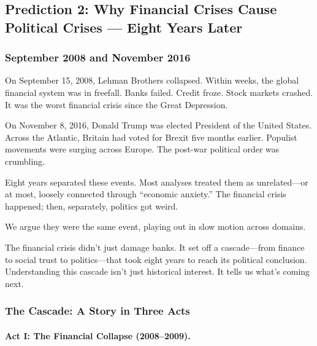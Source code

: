 \subsection{Prediction 2: Why Financial Crises Cause Political Crises --- Eight Years Later}
\label{subsec:pred2-spillovers}


\subsubsection{September 2008 and November 2016}

On September 15, 2008, Lehman Brothers collapsed. Within weeks, the global 
financial system was in freefall. Banks failed. Credit froze. Stock markets 
crashed. It was the worst financial crisis since the Great Depression.

On November 8, 2016, Donald Trump was elected President of the United States. 
Across the Atlantic, Britain had voted for Brexit five months earlier. 
Populist movements were surging across Europe. The post-war political order 
was crumbling.

Eight years separated these events. Most analyses treated them as unrelated---or 
at most, loosely connected through ``economic anxiety.'' The financial crisis 
happened; then, separately, politics got weird.

We argue they were the same event, playing out in slow motion across domains.

The financial crisis didn't just damage banks. It set off a cascade---from 
finance to social trust to politics---that took eight years to reach its 
political conclusion. Understanding this cascade isn't just historical 
interest. It tells us what's coming next.

\subsubsection{The Cascade: A Story in Three Acts}

\paragraph{Act I: The Financial Collapse (2008--2009).}

